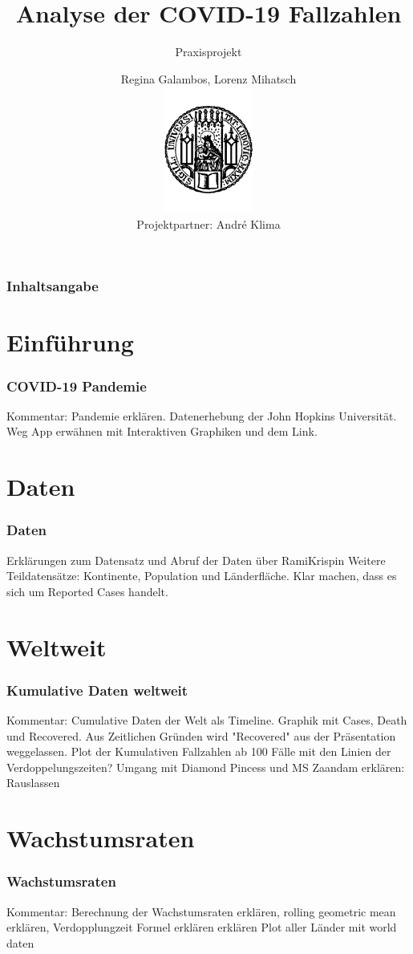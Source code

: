 \documentclass{beamer}
\title[Praxisprojekt: COVID-19]{Analyse der COVID-19 Fallzahlen}
\subtitle{Praxisprojekt}
\author[R.Galambos, L.Mihatsch]{Regina Galambos, Lorenz Mihatsch\\
	\includegraphics[width=0.22\textwidth]{LMU.pdf}\\
	{\small Projektpartner: Andr\'{e} Klima}}
\begin{document}
\begin{frame}
	\titlepage
\end{frame}

\begin{frame}
   \frametitle{Inhaltsangabe}
   \tableofcontents
 \end{frame}
 
 
 \section{Einführung}
 \begin{frame}
 	\frametitle{COVID-19 Pandemie}
	Kommentar: Pandemie erklären. Datenerhebung der John Hopkins Universität.
	Weg App erwähnen mit Interaktiven Graphiken und dem Link.
 \end{frame}
 \section{Daten}
  
 \begin{frame}
 	\frametitle{Daten}
	Erklärungen zum Datensatz und Abruf der Daten über RamiKrispin
	Weitere Teildatensätze: Kontinente, Population und Länderfläche.
	Klar machen, dass es sich um Reported Cases handelt.
 \end{frame}
 
 \section{Weltweit}
 \begin{frame}
 	\frametitle{Kumulative Daten weltweit}
	Kommentar: Cumulative Daten der Welt als Timeline. Graphik mit Cases, Death und Recovered.
	Aus Zeitlichen Gründen wird "Recovered" aus der Präsentation weggelassen.
	Plot der Kumulativen Fallzahlen ab 100 Fälle mit den Linien der Verdoppelungszeiten?
	Umgang mit Diamond Pincess und MS Zaandam erklären: Rauslassen
 \end{frame}
 
\section{Wachstumsraten}
\begin{frame}
\frametitle{Wachstumsraten}
	Kommentar: Berechnung der Wachstumsraten erklären, rolling geometric mean erklären,
	Verdopplungzeit Formel erklären erklären
	Plot aller Länder mit world daten
\end{frame}
\end{document}
